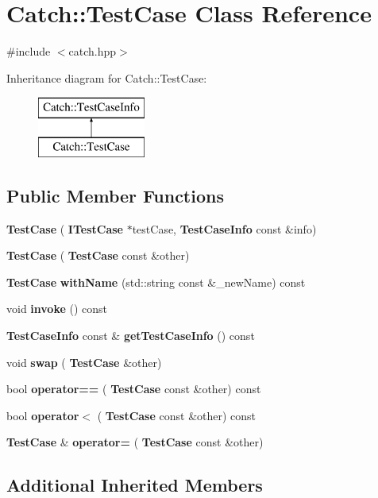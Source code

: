\section{Catch\+:\+:Test\+Case Class Reference}
\label{class_catch_1_1_test_case}


{\ttfamily \#include $<$catch.\+hpp$>$}

Inheritance diagram for Catch\+:\+:Test\+Case\+:\begin{figure}[H]
\begin{center}
\leavevmode
\includegraphics[height=2.000000cm]{class_catch_1_1_test_case}
\end{center}
\end{figure}
\subsection*{Public Member Functions}
\begin{DoxyCompactItemize}
\item 
\textbf{ Test\+Case} (\textbf{ I\+Test\+Case} $\ast$test\+Case, \textbf{ Test\+Case\+Info} const \&info)
\item 
\textbf{ Test\+Case} (\textbf{ Test\+Case} const \&other)
\item 
\textbf{ Test\+Case} \textbf{ with\+Name} (std\+::string const \&\+\_\+new\+Name) const
\item 
void \textbf{ invoke} () const
\item 
\textbf{ Test\+Case\+Info} const  \& \textbf{ get\+Test\+Case\+Info} () const
\item 
void \textbf{ swap} (\textbf{ Test\+Case} \&other)
\item 
bool \textbf{ operator==} (\textbf{ Test\+Case} const \&other) const
\item 
bool \textbf{ operator$<$} (\textbf{ Test\+Case} const \&other) const
\item 
\textbf{ Test\+Case} \& \textbf{ operator=} (\textbf{ Test\+Case} const \&other)
\end{DoxyCompactItemize}
\subsection*{Additional Inherited Members}


